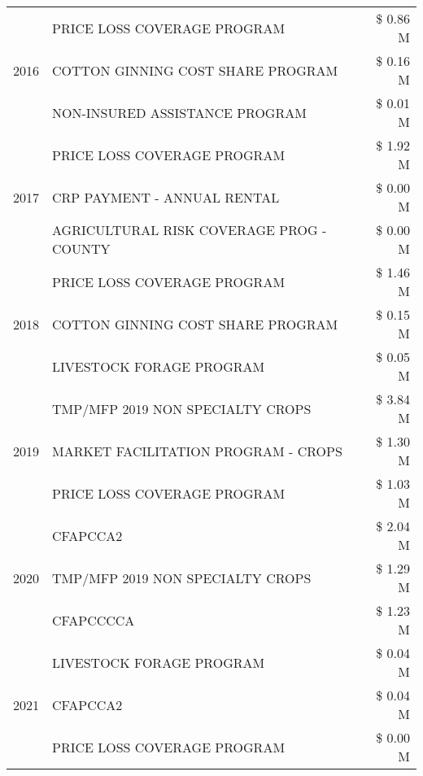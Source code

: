 \begin{tabular}{llr}
\cline{1-3}
\multirow[t]{3}{*}{2016} & PRICE LOSS COVERAGE PROGRAM & \$ 0.86 M \\
 & COTTON GINNING COST SHARE PROGRAM & \$ 0.16 M \\
 & NON-INSURED ASSISTANCE PROGRAM & \$ 0.01 M \\
\cline{1-3}
\multirow[t]{3}{*}{2017} & PRICE LOSS COVERAGE PROGRAM & \$ 1.92 M \\
 & CRP PAYMENT - ANNUAL RENTAL & \$ 0.00 M \\
 & AGRICULTURAL RISK COVERAGE PROG - COUNTY & \$ 0.00 M \\
\cline{1-3}
\multirow[t]{3}{*}{2018} & PRICE LOSS COVERAGE PROGRAM & \$ 1.46 M \\
 & COTTON GINNING COST SHARE PROGRAM & \$ 0.15 M \\
 & LIVESTOCK FORAGE PROGRAM & \$ 0.05 M \\
\cline{1-3}
\multirow[t]{3}{*}{2019} & TMP/MFP 2019 NON SPECIALTY CROPS & \$ 3.84 M \\
 & MARKET FACILITATION PROGRAM - CROPS & \$ 1.30 M \\
 & PRICE LOSS COVERAGE PROGRAM & \$ 1.03 M \\
\cline{1-3}
\multirow[t]{3}{*}{2020} & CFAPCCA2 & \$ 2.04 M \\
 & TMP/MFP 2019 NON SPECIALTY CROPS & \$ 1.29 M \\
 & CFAPCCCCA & \$ 1.23 M \\
\cline{1-3}
\multirow[t]{3}{*}{2021} & LIVESTOCK FORAGE PROGRAM & \$ 0.04 M \\
 & CFAPCCA2 & \$ 0.04 M \\
 & PRICE LOSS COVERAGE PROGRAM & \$ 0.00 M \\
\cline{1-3}
\bottomrule
\end{tabular}

